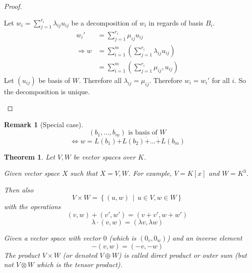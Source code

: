 \documentclass[a4paper,landscape,twocolumn]{article}
\newcommand\setdef[2]{\left\{#1\,\middle|\,#2\right\}}
\newtheorem{theorem}{Theorem}
\newtheorem{rem}{Remark}
\begin{document}
\begin{proof}
\begin{enumerate}
      Let $w_i = \sum_{j=1}^{r_i} \lambda_{ij} u_{ij}$ be a decomposition of $w_i$ in regards of basis $B_i$.
      \begin{align*}
        w_i' &= \sum_{j=1}^{r_i} \mu_{ij} u_{ij} \\
        \Rightarrow w &= \sum_{i=1}^m \left(\sum_{j=1}^{r_i} \lambda_{ij} u_{ij}\right) \\
         &= \sum_{i=1}^m \left(\sum_{j=1}^{r_i} \mu_{ij}, u_{ij}\right)
      \end{align*}
      Let $(u_{ij})$ be basis of $W$. Therefore all $\lambda_{ij} = \mu_{ij}$.
      Therefore $w_i = w_i'$ for all $i$. So the decomposition is unique.
  \end{enumerate}
\end{proof}

\begin{rem}[Special case]
  \[ (b_1, \dots, b_m) \text{ is basis of } W \]
  \[ \Leftrightarrow w = L(b_1) \dot{+} L(b_2) \dot{+} \dots \dot{+} L(b_m) \]
\end{rem}

\begin{theorem}
  \label{satz-4-16}
  Let $V, W$ be vector spaces over $K$.

  Given vector space $X$ such that $X = V,W$.
  For example, $V = K[x]$ and $W = K^3$.

  Then also
  \[ V \times W = \setdef{(u,w)}{u \in V, w \in W} \]
  with the operations
  \[ (v,w) + (v',w') = (v + v', w + w') \]
  \[ \lambda \cdot (v, w) = (\lambda v, \lambda w) \]

  Given a vector space with vector $0$ (which is $(0_v, 0_w)$)
  and an inverse element
  \[ -(v, w) = (-v, -w) \]
  The product $V \times W$ (or denoted $V \oplus W$)
  is called \emph{direct product} or \emph{outer sum}
  (but not $V \otimes W$ which is the tensor product).
\end{theorem}
\end{document}
